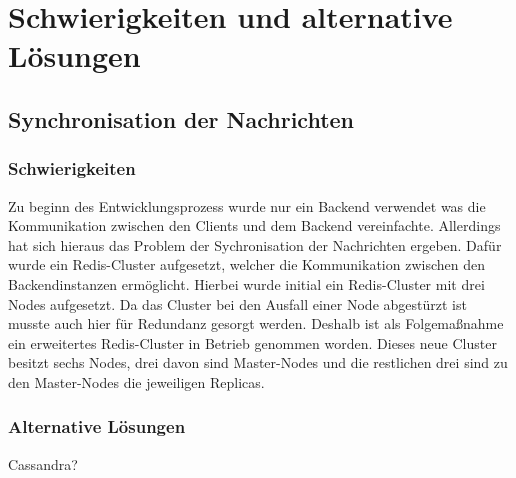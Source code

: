 \chapter{Schwierigkeiten und alternative Lösungen}

\section{Synchronisation der Nachrichten}
\subsection{Schwierigkeiten}
Zu beginn des Entwicklungsprozess wurde nur ein Backend verwendet was die Kommunikation zwischen den Clients und dem Backend vereinfachte.
Allerdings hat sich hieraus das Problem der Sychronisation der Nachrichten ergeben.
Dafür wurde ein Redis-Cluster aufgesetzt, welcher die Kommunikation zwischen den Backendinstanzen ermöglicht.
Hierbei wurde initial ein Redis-Cluster mit drei Nodes aufgesetzt.
Da das Cluster bei den Ausfall einer Node abgestürzt ist musste auch hier für Redundanz gesorgt werden.
Deshalb ist als Folgemaßnahme ein erweitertes Redis-Cluster in Betrieb genommen worden.
Dieses neue Cluster besitzt sechs Nodes, drei davon sind Master-Nodes und die restlichen drei sind zu den Master-Nodes die jeweiligen Replicas.

\subsection{Alternative Lösungen}
Cassandra?
